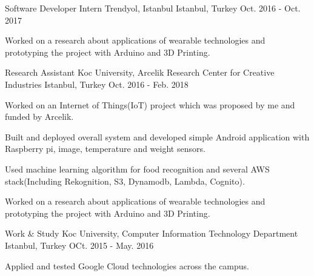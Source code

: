 
\begin{cventries}

  \cventry
   {Software Developer Intern} %
    {Trendyol, Istanbul} %
    {Istanbul, Turkey} %
    {Oct. 2016 - Oct. 2017} %
    {
      \begin{cvitems} %
        \item {Worked on a research about applications of wearable technologies and prototyping the project with Arduino and 3D Printing.  }
      \end{cvitems}
    }

  \cventry
    {Research Assistant} %
    {Koc University, Arcelik Research Center for Creative Industries} %
    {Istanbul, Turkey} %
    {Oct. 2016 - Feb. 2018} %
    {
      \begin{cvitems} %
       	\item {Worked on an Internet of Things(IoT) project which was proposed by me and funded by Arcelik.}
       	\item {Built and deployed overall system and developed simple Android application with Raspberry pi, image, temperature and weight sensors.  }
       	\item {Used machine learning algorithm for food recognition and several AWS stack(Including Rekognition, S3, Dynamodb, Lambda, Cognito).} 
         \item {Worked on a research about applications of wearable technologies and prototyping the project with Arduino and 3D Printing.  }
      \end{cvitems}
    }

  \cventry
    {Work \& Study} %
    {Koc University, Computer Information Technology Department} %
    {Istanbul, Turkey} %
    {OCt. 2015 - May. 2016} %
    {
      \begin{cvitems} %
        \item {Applied and tested Google Cloud technologies across the campus.}
      \end{cvitems}
    }


\end{cventries}

